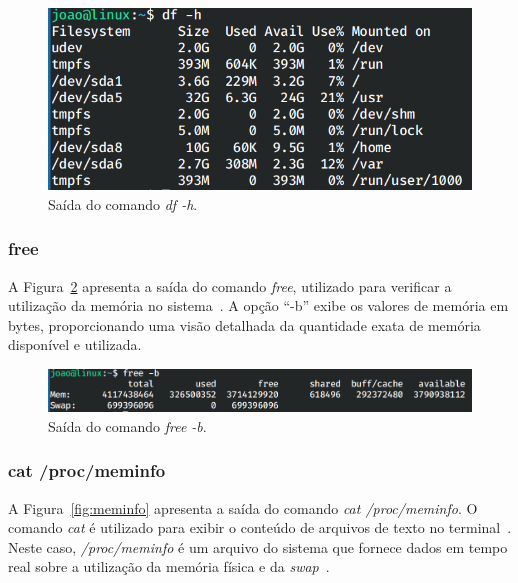 \documentclass[
	12pt,				%
	oneside,   	        %
	a4paper,			%
	english,			%
	french,				%
	spanish,			%
	brazil,				%
	]{pacotes/abntex2}
\begin{document}
\begin{figure}[H]
  \centering
  \includegraphics[scale=0.5]{figuras/df.png}
  \caption{Saída do comando \textit{df -h}.}
  \label{fig:df}
\end{figure}

\subsubsection{free}
A Figura~\ref{fig:free} apresenta a saída do comando \textit{free}, utilizado para verificar a utilização da memória no sistema~\cite{manFree}. A opção ``-b'' exibe os valores de memória em bytes, proporcionando uma visão detalhada da quantidade exata de memória disponível e utilizada.

\begin{figure}[H]
  \centering
  \includegraphics[scale=0.5]{figuras/free.png}
  \caption{Saída do comando \textit{free -b}.}
  \label{fig:free}
\end{figure}

\subsubsection{cat /proc/meminfo}
A Figura~\ref{fig:meminfo} apresenta a saída do comando \textit{cat /proc/meminfo}. O comando \textit{cat} é utilizado para exibir o conteúdo de arquivos de texto no terminal~\cite{manCat}. Neste caso, \textit{/proc/meminfo} é um arquivo do sistema que fornece dados em tempo real sobre a utilização da memória física e da \textit{swap}~\cite{tldpProc}.
\end{document}
